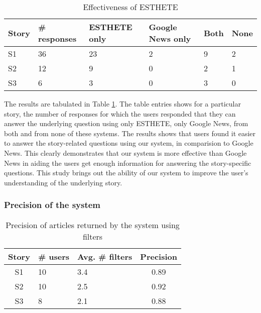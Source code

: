 \begin{table}
\small
\begin{center}
\begin{tabular}{|l|p{1.00cm}|p{1.45cm}|p{1.00cm}|p{1.00cm}|p{1.00cm}|}
\hline
{\bf Story} & {\bf \# responses} & {\bf ESTHETE only} & {\bf Google News only} & {\bf Both} &{\bf None}\\
\hline
S1 & 36 & 23 & 2 & 9 & 2\\
S2 & 12 & 9 & 0 & 2 & 1\\
S3 & 6 & 3 & 0 & 3 & 0 \\
\hline
\end{tabular}
\end{center}
\caption{Effectiveness of ESTHETE}
\label{tab:effectiveness}
\end{table}
\normalsize
The results are tabulated in Table \ref{tab:effectiveness}. The table entries shows for a particular story, the number of responses for which the users responded that they can answer the underlying question using only ESTHETE, only Google News, from both and from none of these systems. The results shows that users found it easier to answer the story-related questions using our system, in comparision to Google News. This clearly demonstrates that our system is more effective than Google News in aiding the users get enough information for answering the story-specific questions. This study brings out the ability of our system to improve the user's understanding of the underlying story.  


\subsubsection{Precision of the system}

\begin{table}
\begin{center}
\small
\begin{tabular}{|c|p{1.25cm}|p{1.25cm}|c|}
\hline
{\bf Story} & {\bf \# users} & {\bf Avg. \# filters} & {\bf Precision}\\
\hline
S1 & 10 & 3.4 & 0.89\\
S2 & 10 & 2.5 & 0.92\\
S3 & 8 & 2.1 & 0.88\\
\hline
\end{tabular}
\end{center}
\caption{Precision of articles returned by the system using filters}
\label{tab:prec}
\end{table}

